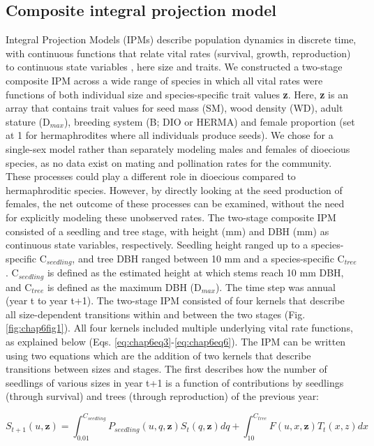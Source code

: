 \documentclass[b5paper,justified]{tufte-book} %
\begin{document}
\begin{fullwidth}
\subsection{Composite integral projection model}
Integral Projection Models (IPMs) describe population dynamics in discrete time, with continuous functions that relate vital rates (survival, growth, reproduction) to continuous state variables \citep{Easterling2000, Ellner2006}, here size and traits. We constructed a two-stage composite IPM across a wide range of species in which all vital rates were functions of both individual size and species-specific trait values \textbf{z}. Here, \textbf{z} is an array that contains trait values for seed mass (SM), wood density (WD), adult stature (D$_{max}$), breeding system (B; DIO or HERMA) and female proportion (set at 1 for hermaphrodites where all individuals produce seeds). We chose for a single-sex model rather than separately modeling males and females of dioecious species, as no data exist on mating and pollination rates for the community. These processes could play a different role in dioecious compared to hermaphroditic species. However, by directly looking at the seed production of females, the net outcome of these processes can be examined, without the need for explicitly modeling these unobserved rates.
	The two-stage composite IPM consisted of a seedling and tree stage, with height (mm) and DBH (mm) as continuous state variables, respectively. Seedling height ranged up to a species-specific C$_{seedling}$, and tree DBH ranged between 10 mm and a species-specific C$_{tree}$. C$_{seedling}$ is defined as the estimated height at which stems reach 10 mm DBH, and C$_{tree}$ is defined as the maximum DBH (D$_{max}$). The time step was annual (year t to year t+1).
The two-stage IPM consisted of four kernels that describe all size-dependent transitions within and between the two stages (Fig. \ref{fig:chap6fig1}). All four kernels included multiple underlying vital rate functions, as explained below (Eqs. \ref{eq:chap6eq3}-\ref{eq:chap6eq6}). The IPM can be written using two equations which are the addition of two kernels that describe transitions between sizes and stages. The first describes how the number of seedlings of various sizes in year t+1 is a function of contributions by seedlings (through survival) and trees (through reproduction) of the previous year:

\begin{equation}
S_{t+1}(u, \textbf{z}) = \int_{0.01}^{C_{seedling}} P_{seedling}(u,q,\textbf{z})S_t(q,\textbf{z})dq +
\int_{10}^{C_{tree}} F(u,x,\textbf{z})T_t(x,z) dx
\label{eq:chap6eq1} 
\end{equation}


\end{fullwidth}
\end{document}
